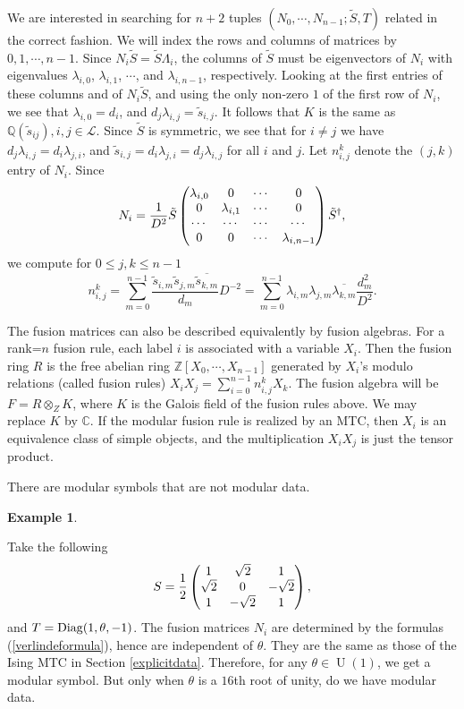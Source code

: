 \documentclass[12pt,psamsfonts]{amsart}
\newcommand{\Q}{\mathbb Q}
\newcommand{\mL}{\mathcal{L}}
\DeclareMathOperator{\U}{U}
\newcommand{\C}{\mathbb C}
\newcommand{\Z}{\mathbb Z}
\newcommand{\tS}{\tilde{S}}
\newcommand{\ts}{\tilde{s}}
\numberwithin{equation}{section}
\theoremstyle{definition}
\newtheorem{ex}[theorem]{Example}
\begin{document}
We are interested in searching for $n+2$ tuples
$(N_0,\cdots,N_{n-1};\tilde{S},T)$ related in the correct fashion.
We will index the rows and columns of matrices by
$0,1,\cdots,n-1$. Since $N_i \tilde S=\tS \Lambda_i$, the columns
of $\tilde S$ must be eigenvectors of $N_i$ with eigenvalues
$\lambda_{i,0}$, $\lambda_{i,1}$, $\cdots$, and $\lambda_{i,n-1}$,
respectively. Looking at the first entries of these columns and of
$N_i\tilde S$, and using the only non-zero $1$ of the first row of
$N_i$, we see that $\lambda_{i,0}=d_i$, and
$d_j\lambda_{i,j}=\tilde s_{i,j}$.  It follows that $K$ is the
same as $\Q(\tilde{s}_{ij}), i,j\in \mL$. Since $\tilde S$ is
symmetric, we see that for $i\ne j$ we have
$d_j\lambda_{i,j}=d_i\lambda_{j,i}$, and $\tilde s_{i,j} =
d_i\lambda_{j,i}=d_j\lambda_{i,j}$ for all $i$ and $j$. Let
$n_{i,j}^k$ denote the $(j,k)$ entry of $N_i$. Since
$$N_i = \frac{1}{D^2} \tilde S \left(\begin{matrix} \lambda_{i,0} & 0 & \cdots &
0\cr 0 & \lambda_{i,1} & \cdots & 0\cr \cdots & \cdots & \cdots &
\cdots \cr 0 & 0 & \cdots & \lambda_{i,n-1}\end{matrix}\right)
\tS^{\dagger},$$ we compute for $0\le j,k\le n-1$
\begin{equation}\label{verlindeformula}
n_{i,j}^k =\sum_{m=0}^{n-1} \frac{\tilde s_{i,m} \ts_{j,m}
\overline{\ts_{k,m}}}{d_m} D^{-2} = \sum_{m=0}^{n-1} \lambda_{i,m}
\lambda_{j,m} \overline{\lambda_{k,m}} \frac{d_m^2}{D^2}.
\end{equation}

The fusion matrices can also be described equivalently by fusion
algebras.  For a rank=$n$ fusion rule, each label $i$ is
associated with a variable $X_i$. Then the fusion ring $R$ is the
free abelian ring $\Z[X_0,\cdots, X_{n-1}]$ generated by $X_i$'s
modulo relations (called fusion rules) $X_i
X_j=\sum_{i=0}^{n-1}n^k_{i,j}X_k.$ The fusion algebra will be
$F=R\otimes_{Z}K$, where $K$ is the Galois field of the fusion
rules above.  We may replace $K$ by $\C$. If the modular fusion
rule is realized by an MTC, then $X_i$ is an equivalence class of
simple objects, and the multiplication $X_iX_j$ is just the tensor
product.

There are modular symbols that are not modular data.

\begin{ex}\label{isingex}

Take the following
$$S=\frac{1}{2} \left(\begin{matrix} 1 & \sqrt{2} & 1\cr
\sqrt{2} & 0 & -\sqrt{2}\cr 1 & -\sqrt{2} &
1\end{matrix}\right),$$ and $T=\operatorname{Diag}(1,\theta,-1)$.  The fusion
matrices $N_i$ are determined by the formulas
(\ref{verlindeformula}), hence are independent of $\theta$.  They
are the same as those of the Ising MTC in Section
\ref{explicitdata}. Therefore, for any $\theta \in \U(1)$, we get
a modular symbol. But only when $\theta$ is a $16$th root of
unity, do we have modular data.

\end{ex}
\end{document}
